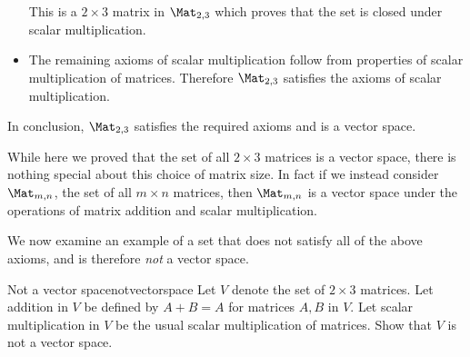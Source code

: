 \begin{solution}
\begin{itemize}
This is a $2 \times 3$ matrix in $\Mat_{2,3}$ which proves that the set is closed under scalar multiplication. 

\item The remaining axioms of scalar multiplication follow from properties of scalar multiplication of matrices. Therefore $\Mat_{2,3}$ satisfies the axioms of scalar multiplication. 
\end{itemize}

In conclusion, $\Mat_{2,3}$ satisfies the required axioms and is a vector space. 
\end{solution}

While here we proved that the set of all $2 \times 3$ matrices is a vector space, there is nothing special about this choice of matrix size. In fact if we instead consider $\Mat_{m,n}$, the set of all $m \times n$ matrices, then  $\Mat_{m,n}$ is a vector space under the operations of matrix addition and scalar multiplication. 

We now examine an example of a set that does not satisfy all of the above axioms, and is therefore \textit{not} a vector space. 

\begin{example}{Not a vector space}{notvectorspace}
Let $V$ denote the set of $2 \times 3$ matrices. Let addition in $V$ be defined by $A + B = A$ for matrices $A,B$ in $V$. Let scalar multiplication in $V$ be the usual scalar multiplication of matrices. Show that $V$ is not a vector space.
\end{example}

